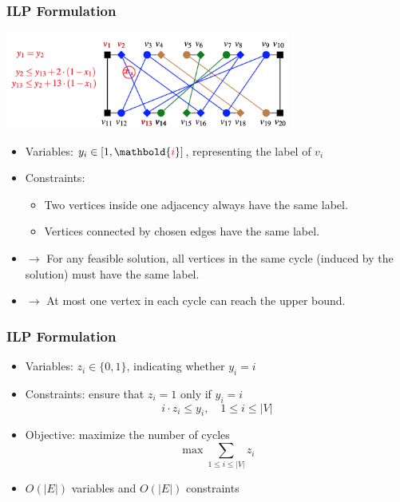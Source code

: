 \documentclass[mathserif]{beamer}
\begin{document}
\frame
{
	\frametitle{ILP Formulation}

	\begin{center}
		\includegraphics[width=0.7\textwidth]{L8-DCJ8.png}
	\end{center}

	\begin{itemize}
	\item Variables: $y_i \in [1, \mathbold{\textcolor{red}i}]$, representing the label of $v_i$
	\item Constraints: 
		\begin{itemize}
			\item Two vertices inside one adjacency always have the same label.
			\item Vertices connected by chosen edges have the same label.
		\end{itemize}
		
		\item $\rightarrow$ For any feasible solution, all vertices in the same cycle (induced by the solution) must have the same label.
		\item $\rightarrow$ At most one vertex in each cycle can reach the upper bound.
	\end{itemize}
}

\frame
{
	\frametitle{ILP Formulation}
	\vspace{-0.2cm}
	\begin{itemize}
	\item<1-> Variables: $z_i \in \{0,1\}$, indicating whether $y_i = i$
	\vspace{0.3cm}
	\item<1-> Constraints: ensure that $z_i = 1$ only if $y_i = i$
		$$i\cdot z_i \le y_i,\quad 1 \le i \le |V|$$
	\item<1-> Objective: maximize the number of cycles
		$$\max \sum_{1\le i \le |V|} z_i$$
	\vspace{0.3cm}
	\item<1-> $O(|E|)$ variables and $O(|E|)$ constraints
	\end{itemize}
}


\end{document}
